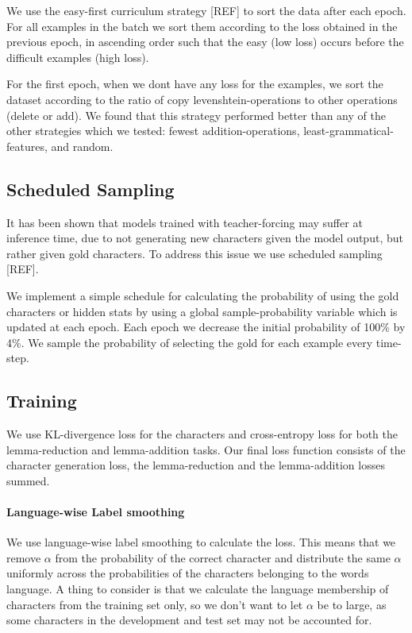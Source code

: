 \documentclass[11pt,a4paper]{article}
\begin{document}
We use the easy-first curriculum strategy [REF] to sort the data after
each epoch. For all examples in the batch we sort them according to
the loss obtained in the previous epoch, in ascending order such that the easy (low loss) occurs
before the difficult examples (high loss).  

For the first epoch, when we dont have any loss for the examples, we
sort the dataset according to the ratio of copy levenshtein-operations
to other operations (delete or add). We found that this strategy
performed better than any of the other strategies which we tested:
fewest addition-operations, least-grammatical-features, and random.

\subsection{Scheduled Sampling}

It has been shown that models trained with teacher-forcing may suffer
at inference time, due to not generating new characters given the
model output, but rather given gold characters. To address this issue
we use scheduled sampling [REF]. 

We implement a simple schedule for calculating the probability of
using the gold characters or hidden stats by using a global
sample-probability variable which is updated at each epoch. Each epoch
we decrease the initial probability of 100\% by 4\%. We sample the
probability of selecting the gold for each example every time-step.

\subsection{Training}

We use KL-divergence loss for the characters and cross-entropy loss
for both the lemma-reduction and lemma-addition tasks. Our final loss
function consists of the character generation loss, the
lemma-reduction and the lemma-addition losses summed.

\paragraph{Language-wise Label smoothing} We use language-wise label
smoothing to calculate the loss. This means that we remove $\alpha$
from the probability of the correct character and distribute the same $\alpha$
uniformly across the probabilities of the characters belonging to the words language. A
thing to consider is that we calculate the language membership of
characters from the training set only, so we don't want to let
$\alpha$ be to large, as some characters in the development and test
set may not be accounted for.
\end{document}
